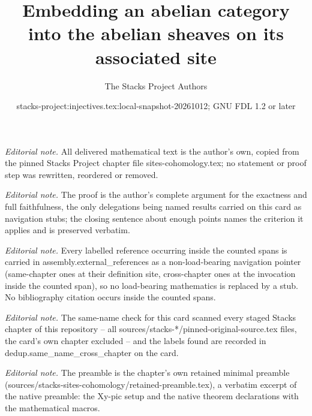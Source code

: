 \documentclass[10pt,a4paper]{amsart}
\title{Embedding an abelian category into the abelian sheaves on its associated site}
\author{The Stacks Project Authors}
\date{stacks-project:injectives.tex:local-snapshot-20261012; GNU FDL 1.2 or later}
\theoremstyle{plain}
\theoremstyle{definition}
\theoremstyle{remark}
\numberwithin{equation}{subsection}
\begin{document}
\maketitle
\noindent\textit{Editorial note.} All delivered mathematical text is the author's own, copied from the pinned Stacks Project chapter file sites-cohomology.tex; no statement or proof step was rewritten, reordered or removed.\par\medskip
\noindent\textit{Editorial note.} The proof is the author's complete argument for the exactness and full faithfulness, the only delegations being named results carried on this card as navigation stubs; the closing sentence about enough points names the criterion it applies and is preserved verbatim.\par\medskip
\noindent\textit{Editorial note.} Every labelled reference occurring inside the counted spans is carried in assembly.external\_references as a non-load-bearing navigation pointer (same-chapter ones at their definition site, cross-chapter ones at the invocation inside the counted span), so no load-bearing mathematics is replaced by a stub. No bibliography citation occurs inside the counted spans.\par\medskip
\noindent\textit{Editorial note.} The same-name check for this card scanned every staged Stacks chapter of this repository -- all sources/stacks-*/pinned-original-source.tex files, the card's own chapter excluded -- and the labels found are recorded in dedup.same\_name\_cross\_chapter on the card.\par\medskip
\noindent\textit{Editorial note.} The preamble is the chapter's own retained minimal preamble (sources/stacks-sites-cohomology/retained-preamble.tex), a verbatim excerpt of the native preamble: the Xy-pic setup and the native theorem declarations with the mathematical macros.\par\medskip
\end{document}
